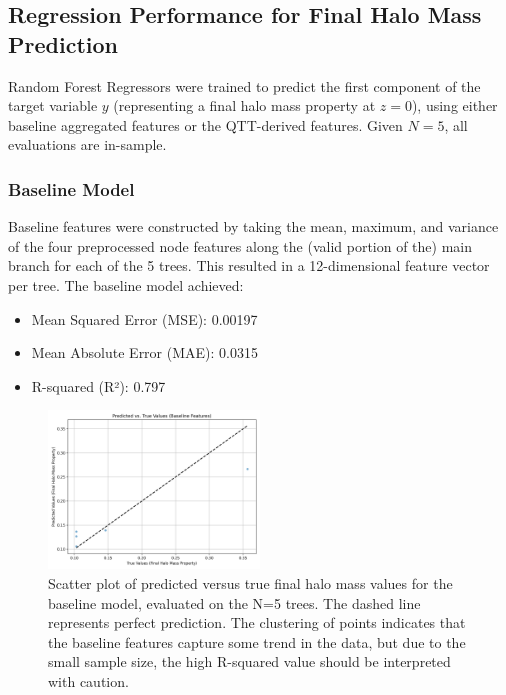 \documentclass[twocolumn]{aastex631}
\begin{document}
\subsection{Regression Performance for Final Halo Mass Prediction}

Random Forest Regressors were trained to predict the first component of the target variable $y$ (representing a final halo mass property at $z=0$), using either baseline aggregated features or the QTT-derived features. Given $N=5$, all evaluations are in-sample.

\subsubsection{Baseline Model}
Baseline features were constructed by taking the mean, maximum, and variance of the four preprocessed node features along the (valid portion of the) main branch for each of the 5 trees. This resulted in a 12-dimensional feature vector per tree.
The baseline model achieved:
\begin{itemize}
    \item Mean Squared Error (MSE): 0.00197
    \item Mean Absolute Error (MAE): 0.0315
    \item R-squared (R²): 0.797
\end{itemize}

\begin{figure}[h!]
    \centering
    \includegraphics[width=0.5\textwidth]{../input_files/plots/pred_vs_true_baseline_1_20250524-175150.png}
    \caption{Scatter plot of predicted versus true final halo mass values for the baseline model, evaluated on the N=5 trees. The dashed line represents perfect prediction. The clustering of points indicates that the baseline features capture some trend in the data, but due to the small sample size, the high R-squared value should be interpreted with caution.
}
    \label{fig:pred_vs_true_baseline}
\end{figure}
\end{document}
